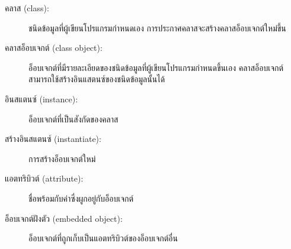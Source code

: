 \begin{description}

\item[คลาส (class):] ชนิดข้อมูลที่ผู้เขียนโปรแกรมกำหนดเอง การประกาศคลาสจะสร้างคลาสอ็อบเจกต์ใหม่ขึ้น


\item[คลาสอ็อบเจกต์ (class object):] อ็อบเจกต์ที่มีรายละเอียดของชนิดข้อมูลที่ผู้เขียนโปรแกรมกำหนดขึ้นเอง
คลาสอ็อบเจกต์สามารถใช้สร้างอินแสตนซ์ของชนิดข้อมูลนั้นได้

\item[อินสแตนซ์ (instance):] อ็อบเจกต์ที่เป็นสังกัดของคลาส

\item[สร้างอินสแตนซ์ (instantiate):] การสร้างอ็อบเจกต์ใหม่

\item[แอตทริบิวต์ (attribute):] ชื่อพร้อมกับค่าซึ่งผูกอยู่กับอ็อบเจกต์


\item[อ็อบเจกต์ฝังตัว (embedded object):] อ็อบเจกต์ที่ถูกเก็บเป็นแอตทริบิวต์ของอ็อบเจกต์อื่น



\end{description}
